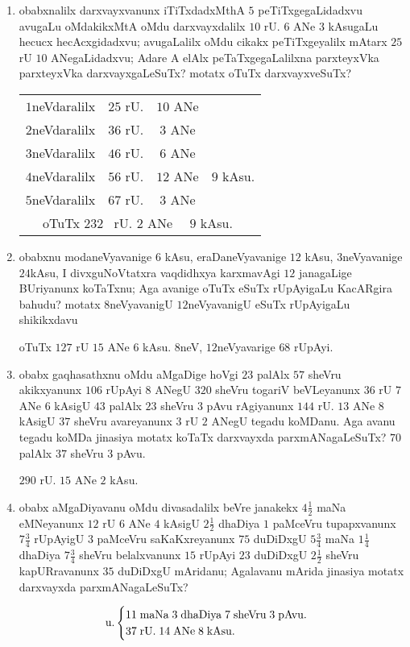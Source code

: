 \begin{enumerate}[\rm(1)]
\item obabxnalilx darxvayxvanunx iTiTxdadxMthA $5$ peTiTxgegaLidadxvu avugaLu oMdakikxMtA oMdu darxvayxdalilx $10$ rU. $6$ ANe $3$ kAsugaLu hecucx hecAcxgidadxvu; avugaLalilx oMdu cikakx peTiTxgeyalilx mAtarx $25$ rU $10$ ANegaLidadxvu; Adare A elAlx peTaTxgegaLalilxna parxteyxVka parxteyxVka darxvayxgaLeSuTx? motatx oTuTx darxvayxveSuTx?
\begin{center}
\begin{tabular}{cccc}
$1$neVdaralilx & $25$ rU. & $10$ ANe\\
$2$neVdaralilx & $36$ rU. & $3$ ANe\\
$3$neVdaralilx & $46$ rU. & $6$ ANe\\
$4$neVdaralilx & $56$ rU. & $12$ ANe & $9$ kAsu.\\
$5$neVdaralilx & $67$ rU. & $3$ ANe\\
\cline{2-3}
\multicolumn{4}{l}{\qquad~~ oTuTx $232$ \ rU. $2$ ANe \ \ $9$ kAsu.}\\
\cline{2-3}
\end{tabular}
\end{center}

\item obabxnu modaneVyavanige $6$ kAsu, eraDaneVyavanige $12$ kAsu, $3$neVyavanige $24$kAsu, I divxguNoVtatxra vaqdidhxya karxmavAgi $12$ janagaLige BUriyanunx koTaTxnu; Aga avanige oTuTx eSuTx rUpAyigaLu KacARgira bahudu? motatx $8$neVyavanigU $12$neVyavanigU eSuTx rUpAyigaLu shikikxdavu 

\hfill oTuTx $127$ rU $15$ ANe $6$ kAsu. $8$neV, $12$neVyavarige $68$ rUpAyi.

\item obabx gaqhasathxnu oMdu aMgaDige hoVgi $23$ palAlx $57$ sheVru akikxyanunx $106$ rUpAyi $8$ ANegU $320$ sheVru togariV beVLeyanunx $36$ rU $7$ ANe $6$ kAsigU $43$ palAlx $23$ sheVru $3$ pAvu rAgiyanunx $144$ rU. $13$ ANe $8$ kAsigU $37$ sheVru avareyanunx $3$ rU $2$ ANegU tegadu koMDanu. Aga avanu tegadu koMDa jinasiya motatx koTaTx darxvayxda parxmANagaLeSuTx? \hfill $70$ palAlx $37$ sheVru $3$ pAvu.

\hfill $290$ rU. $15$ ANe $2$ kAsu.

\item obabx aMgaDiyavanu oMdu divasadalilx beVre janakekx $4\frac{1}{2}$ maNa eMNeyanunx $12$ rU $6$ ANe $4$ kAsigU $2\frac{1}{2}$ dhaDiya $1$ paMceVru tupapxvanunx $7\frac{3}{4}$ rUpAyigU $3$ paMceVru saKaKxreyanunx $75$ duDiDxgU $5\frac{3}{4}$ maNa $1\frac{1}{4}$ dhaDiya $7\frac{3}{4}$ sheVru belalxvanunx $15$ rUpAyi $23$ duDiDxgU $2\frac{1}{2}$ sheVru kapURravanunx $35$ duDiDxgU mAridanu; Agalavanu mArida jinasiya motatx darxvayxda parxmANagaLeSuTx?

\begin{equation*}
\text{u.}\\
\begin{cases}
11\; \text{maNa}\; 3\; \text{dhaDiya}\; 7\; \text{sheVru}\; 3\; \text{pAvu.}\\
37\; \text{rU.}\; 14\; \text{ANe}\; 8\; \text{kAsu.}
\end{cases}
\end{equation*}
\end{enumerate}



